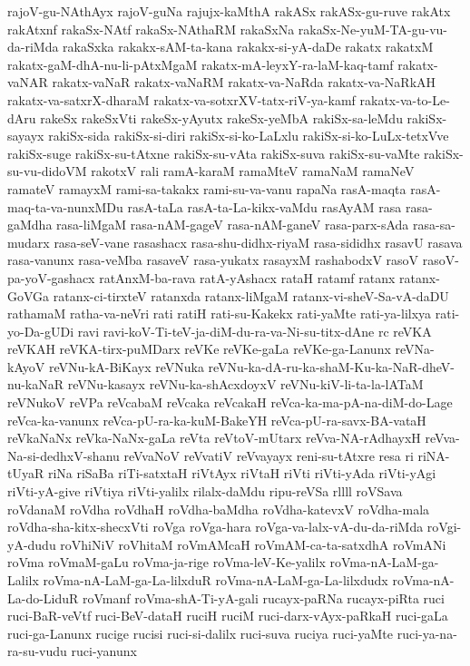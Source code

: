 {rajoV-gu-NAthAyx
rajoV-guNa
rajujx-kaMthA
rakASx
rakASx-gu-ruve
rakAtx
rakAtxnf
rakaSx-NAtf
rakaSx-NAthaRM
rakaSxNa
rakaSx-Ne-yuM-TA-gu-vu-da-riMda
rakaSxka
rakakx-sAM-ta-kana
rakakx-si-yA-daDe
rakatx
rakatxM
rakatx-gaM-dhA-nu-li-pAtxMgaM
rakatx-mA-leyxY-ra-laM-kaq-tamf
rakatx-vaNAR
rakatx-vaNaR
rakatx-vaNaRM
rakatx-va-NaRda
rakatx-va-NaRkAH
rakatx-va-satxrX-dharaM
rakatx-va-sotxrXV-tatx-riV-ya-kamf
rakatx-va-to-Le-dAru
rakeSx
rakeSxVti
rakeSx-yAyutx
rakeSx-yeMbA
rakiSx-sa-leMdu
rakiSx-sayayx
rakiSx-sida
rakiSx-si-diri
rakiSx-si-ko-LaLxlu
rakiSx-si-ko-LuLx-tetxVve
rakiSx-suge
rakiSx-su-tAtxne
rakiSx-su-vAta
rakiSx-suva
rakiSx-su-vaMte
rakiSx-su-vu-didoVM
rakotxV
rali
ramA-karaM
ramaMteV
ramaNaM
ramaNeV
ramateV
ramayxM
rami-sa-takakx
rami-su-va-vanu
rapaNa
rasA-maqta
rasA-maq-ta-va-nunxMDu
rasA-taLa
rasA-ta-La-kikx-vaMdu
rasAyAM
rasa
rasa-gaMdha
rasa-liMgaM
rasa-nAM-gageV
rasa-nAM-ganeV
rasa-parx-sAda
rasa-sa-mudarx
rasa-seV-vane
rasashacx
rasa-shu-didhx-riyaM
rasa-sididhx
rasavU
rasava
rasa-vanunx
rasa-veMba
rasaveV
rasa-yukatx
rasayxM
rashabodxV
rasoV
rasoV-pa-yoV-gashacx
ratAnxM-ba-rava
ratA-yAshacx
rataH
ratamf
ratanx
ratanx-GoVGa
ratanx-ci-tirxteV
ratanxda
ratanx-liMgaM
ratanx-vi-sheV-Sa-vA-daDU
rathamaM
ratha-va-neVri
rati
ratiH
rati-su-Kakekx
rati-yaMte
rati-ya-lilxya
rati-yo-Da-gUDi
ravi
ravi-koV-Ti-teV-ja-diM-du-ra-va-Ni-su-titx-dAne
rc
reVKA
reVKAH
reVKA-tirx-puMDarx
reVKe
reVKe-gaLa
reVKe-ga-Lanunx
reVNa-kAyoV
reVNu-kA-BiKayx
reVNuka
reVNu-ka-dA-ru-ka-shaM-Ku-ka-NaR-dheV-nu-kaNaR
reVNu-kasayx
reVNu-ka-shAcxdoyxV
reVNu-kiV-li-ta-la-lATaM
reVNukoV
reVPa
reVcabaM
reVcaka
reVcakaH
reVca-ka-ma-pA-na-diM-do-Lage
reVca-ka-vanunx
reVca-pU-ra-ka-kuM-BakeYH
reVca-pU-ra-savx-BA-vataH
reVkaNaNx
reVka-NaNx-gaLa
reVta
reVtoV-mUtarx
reVva-NA-rAdhayxH
reVva-Na-si-dedhxV-shanu
reVvaNoV
reVvatiV
reVvayayx
reni-su-tAtxre
resa
ri
riNA-tUyaR
riNa
riSaBa
riTi-satxtaH
riVtAyx
riVtaH
riVti
riVti-yAda
riVti-yAgi
riVti-yA-give
riVtiya
riVti-yalilx
rilalx-daMdu
ripu-reVSa
rllll
roVSava
roVdanaM
roVdha
roVdhaH
roVdha-baMdha
roVdha-katevxV
roVdha-mala
roVdha-sha-kitx-shecxVti
roVga
roVga-hara
roVga-va-lalx-vA-du-da-riMda
roVgi-yA-dudu
roVhiNiV
roVhitaM
roVmAMcaH
roVmAM-ca-ta-satxdhA
roVmANi
roVma
roVmaM-gaLu
roVma-ja-rige
roVma-leV-Ke-yalilx
roVma-nA-LaM-ga-Lalilx
roVma-nA-LaM-ga-La-lilxduR
roVma-nA-LaM-ga-La-lilxdudx
roVma-nA-La-do-LiduR
roVmanf
roVma-shA-Ti-yA-gali
rucayx-paRNa
rucayx-piRta
ruci
ruci-BaR-veVtf
ruci-BeV-dataH
ruciH
ruciM
ruci-darx-vAyx-paRkaH
ruci-gaLa
ruci-ga-Lanunx
rucige
rucisi
ruci-si-dalilx
ruci-suva
ruciya
ruci-yaMte
ruci-ya-na-ra-su-vudu
ruci-yanunx
}
